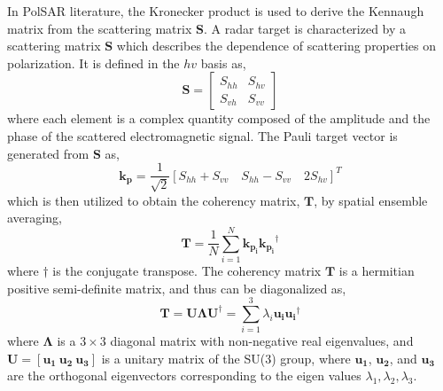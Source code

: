 In PolSAR literature, the Kronecker product is used to derive the Kennaugh matrix from the scattering matrix $  \mathbf{S} $.  
A radar target is characterized by a scattering matrix $\mathbf{S}$ which describes the dependence of scattering properties on polarization. It is defined in the $hv$ basis as,
\begin{equation}
\bm{\mathbf{S}} =
  \begin{bmatrix}
    S_{hh} & S_{hv}  \\
    S_{vh} & S_{vv}
  \end{bmatrix}
 \label{eqn:scattring}
\end{equation}
where each element is a complex quantity composed of the amplitude and the phase of the scattered electromagnetic signal.
The Pauli target vector is generated from $\mathbf{S}$ as,
\begin{equation}
\bm{k_p} = \frac{1}{\sqrt{2}} \left[ S_{hh}+S_{vv} \quad S_{hh}-S_{vv} \quad  2S_{hv} \right] ^{T}
\end{equation}
which is then utilized to obtain the coherency matrix, $\mathbf{T}$, by spatial ensemble averaging,
\begin{equation}
\mathbf{T} = \frac{1}{N} \sum_{i=1}^{N} \bm{k_{p_i}}\bm{k_{p_i}}^{\dagger} 
\end{equation}
where $\dagger$ is the conjugate transpose. The coherency matrix $\mathbf{T}$ is a hermitian positive semi-definite matrix, and thus  can be diagonalized as,
\begin{equation}
\mathbf{T}  = \mathbf{U}  \mathbf{ \Lambda }\mathbf{ U^{\dagger}} = \sum\limits_{i=1}^{3}\lambda_{i}\bm{u_i} \bm{u_i}^{\dagger}
\end{equation}
where $\mathbf{ \Lambda}$ is a $3\times3$ diagonal matrix with non-negative real eigenvalues, and $\mathbf{U} = [\bm{u_1}\ \bm{u_2}\ \bm{u_3}]$ is a unitary matrix of the SU(3) group, where $\bm{u_1}$, $\bm{u_2}$, and $\bm{u_3}$ are the orthogonal eigenvectors corresponding to the eigen values $\lambda_1,\lambda_2,\lambda_3$. 

